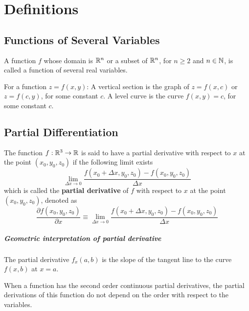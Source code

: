 \chapter{Definitions}
\theoremstyle{definition}

\section{Functions of Several Variables}
\begin{mydef}
\normalfont A function \(f\) whose domain is \(\mathbb{R}^n\) or a subset of \(\mathbb{R}^n\), for \(n \ge 2\) and \(n \in \mathbb{N}\), is called a function of several real variables.
\end{mydef}


\begin{mydef}
\normalfont For a function \(z = f(x, y)\): A vertical section is the graph of \(z = f(x, c)\) or \(z = f(c, y)\), for some constant \(c\). A level curve is the curve \(f(x, y) = c\), for some constant \(c\).
\end{mydef}


\section{Partial Differentiation}
\begin{mydef}
\normalfont The function \(f : \mathbb{R}^3 \to \mathbb{R}\) is said to have a partial derivative with respect to \(x\) at the point \((x_0, y_0, z_0)\) if the following limit exists
%
\[\lim_{\Delta x \to 0}{\frac{f(x_0 + \Delta x, y_0, z_0) - f(x_0, y_0, z_0)}{\Delta x}}\]
%
which is called the \textbf{partial derivative} of \(f\) with respect to \(x\) at the point \((x_0, y_0, z_0)\), denoted as
%
\[\frac{\partial f(x_0, y_0, z_0)}{\partial x} \equiv \lim_{\Delta x \to 0}{\frac{f(x_0 + \Delta x, y_0, z_0) - f(x_0, y_0, z_0)}{\Delta x}}\]
\end{mydef}

\paragraph{Geometric interpretation of partial derivative} The partial derivative 
\(f_x(a,b)\) is the slope of the tangent line to the curve \(f(x, b)\) at \(x = a\).

\begin{mythm}\normalfont
When a function has the second order continuous partial derivatives, the partial derivations of this function do not depend on the order with respect to the variables.
\end{mythm}

